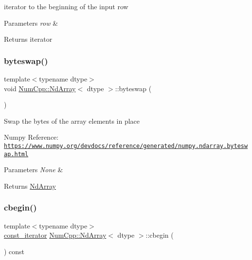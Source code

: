 iterator to the beginning of the input row


\begin{DoxyParams}{Parameters}
{\em row} & \\
\hline
\end{DoxyParams}
\begin{DoxyReturn}{Returns}
iterator 
\end{DoxyReturn}
\mbox{\label{class_num_cpp_1_1_nd_array_ad3fb7bfa80870bf4dbdf4829d7666521}} 
\subsubsection{\texorpdfstring{byteswap()}{byteswap()}}
{\footnotesize\ttfamily template$<$typename dtype$>$ \\
void \mbox{\hyperlink{class_num_cpp_1_1_nd_array}{Num\+Cpp\+::\+Nd\+Array}}$<$ dtype $>$\+::byteswap (\begin{DoxyParamCaption}{ }\end{DoxyParamCaption})\hspace{0.3cm}{\ttfamily [inline]}}

Swap the bytes of the array elements in place

Numpy Reference\+: \href{https://www.numpy.org/devdocs/reference/generated/numpy.ndarray.byteswap.html}{\tt https\+://www.\+numpy.\+org/devdocs/reference/generated/numpy.\+ndarray.\+byteswap.\+html}


\begin{DoxyParams}{Parameters}
{\em None} & \\
\hline
\end{DoxyParams}
\begin{DoxyReturn}{Returns}
\mbox{\hyperlink{class_num_cpp_1_1_nd_array}{Nd\+Array}} 
\end{DoxyReturn}
\mbox{\label{class_num_cpp_1_1_nd_array_acddd7dd5f95c7e8bd88af5a6cbb6d069}} 
\subsubsection{\texorpdfstring{cbegin()}{cbegin()}\hspace{0.1cm}{\footnotesize\ttfamily [1/2]}}
{\footnotesize\ttfamily template$<$typename dtype$>$ \\
\mbox{\hyperlink{class_num_cpp_1_1_nd_array_a770eaf3b67efaa19e310ed14eee5aabb}{const\+\_\+iterator}} \mbox{\hyperlink{class_num_cpp_1_1_nd_array}{Num\+Cpp\+::\+Nd\+Array}}$<$ dtype $>$\+::cbegin (\begin{DoxyParamCaption}{ }\end{DoxyParamCaption}) const\hspace{0.3cm}{\ttfamily [inline]}}

